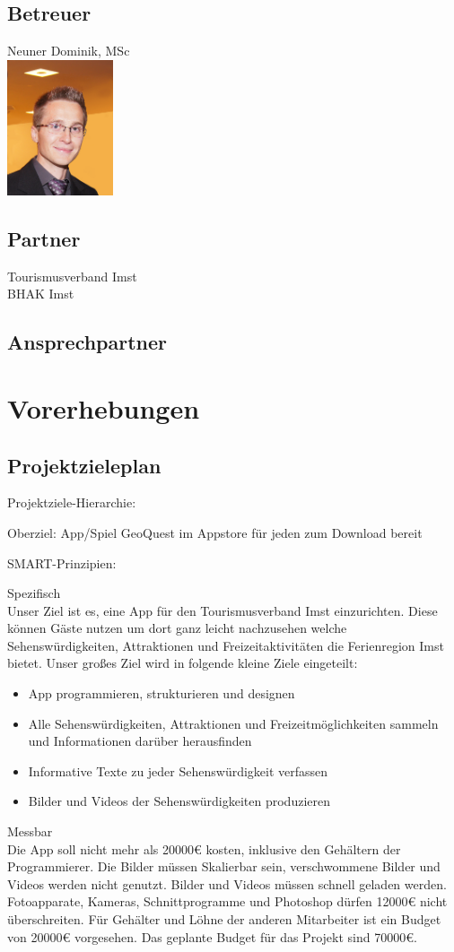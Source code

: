\subsection{Betreuer}
Neuner Dominik, MSc\\
\includegraphics[height=4cm]{neuner}
\subsection{Partner}
Tourismusverband Imst\\
BHAK Imst
\subsection{Ansprechpartner}
\section{Vorerhebungen}
\subsection{Projektzieleplan}
Projektziele-Hierarchie:

Oberziel: App/Spiel GeoQuest im Appstore für jeden zum Download bereit

SMART-Prinzipien:

Spezifisch\\
Unser Ziel ist es, eine App für den Tourismusverband Imst einzurichten. Diese können Gäste nutzen um dort ganz leicht nachzusehen welche Sehenswürdigkeiten, Attraktionen und Freizeitaktivitäten die Ferienregion Imst bietet. Unser großes Ziel wird in folgende kleine Ziele eingeteilt:
\begin{itemize}
\item App programmieren, strukturieren und designen
\item Alle Sehenswürdigkeiten, Attraktionen und Freizeitmöglichkeiten sammeln und Informationen darüber herausfinden
\item Informative Texte zu jeder Sehenswürdigkeit verfassen
\item Bilder und Videos der Sehenswürdigkeiten produzieren
\end{itemize}
Messbar\\
Die App soll nicht mehr als 20000€ kosten, inklusive den Gehältern der Programmierer. Die Bilder müssen Skalierbar sein, verschwommene Bilder und Videos werden nicht genutzt. Bilder und Videos müssen schnell geladen werden. Fotoapparate, Kameras, Schnittprogramme und Photoshop dürfen 12000€ nicht überschreiten. Für Gehälter und Löhne der anderen Mitarbeiter ist ein Budget von 20000€ vorgesehen. Das geplante Budget für das Projekt sind 70000€.

